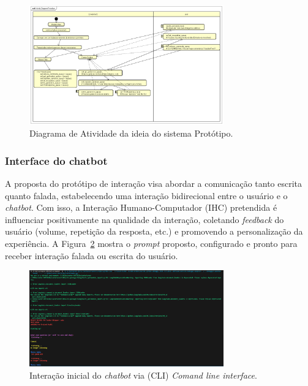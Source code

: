\documentclass[10pt, conference, compsocconf]{IEEEtran}
\begin{document}
\FloatBarrier

\begin{figure}[!h]
\centering
\includegraphics[width=3.3in]{images/Activity Diagram Prototipo.png}
\caption{Diagrama de Atividade da ideia do sistema Protótipo.} 
\label{fig:Diagrama de Atividade}
\end{figure}

\FloatBarrier

\subsubsection{Interface do chatbot} %
A proposta do protótipo de interação visa abordar a comunicação tanto escrita quanto falada, estabelecendo uma interação bidirecional entre o usuário e o \textit{chatbot}. Com isso, a Interação Humano-Computador (IHC) pretendida é influenciar positivamente na qualidade da interação, coletando \textit{feedback} do usuário (volume, repetição da resposta, etc.) e promovendo a personalização da experiência. A Figura~\ref{fig:chatbot} mostra o \textit{prompt} proposto, configurado e pronto para receber interação falada ou escrita do usuário.

\FloatBarrier

\begin{figure}[!h]
\centering
\includegraphics[width=3.3in]{images/Prototipo test.png}
\caption{Interação inicial do \textit{chatbot} via (CLI) \textit{Comand line interface}.} 
\label{fig:chatbot}
\end{figure}
\end{document}
